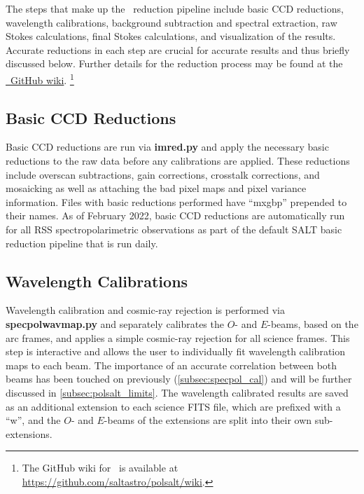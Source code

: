 The steps that make up the \polsalt\ reduction pipeline include basic \gls{CCD} reductions, wavelength calibrations, background subtraction and spectral extraction, raw Stokes calculations, final Stokes calculations, and visualization of the results. Accurate reductions in each step are crucial for accurate results and thus briefly discussed below. Further details for the reduction process may be found at the \href{https://github.com/saltastro/polsalt/wiki}{\polsalt\ GitHub wiki}.%
\footnote{The GitHub wiki for \polsalt\ is available at \url{https://github.com/saltastro/polsalt/wiki}.}

\subsection{Basic CCD Reductions}

Basic \gls{CCD} reductions are run via \textbf{imred.py} and apply the necessary basic reductions to the raw data before any calibrations are applied. These reductions include overscan subtractions, gain corrections, crosstalk corrections, and mosaicking as well as attaching the bad pixel maps and pixel variance information. Files with basic reductions performed have ``mxgbp'' prepended to their names. As of February 2022, basic \gls{CCD} reductions are automatically run for all RSS spectropolarimetric observations as part of the default SALT basic reduction pipeline that is run daily.

\subsection{Wavelength Calibrations}

Wavelength calibration and cosmic-ray rejection is performed via \textbf{specpolwavmap.py} and separately calibrates the $O$- and $E$-beams, based on the arc frames, and applies a simple cosmic-ray rejection for all science frames. This step is interactive and allows the user to individually fit wavelength calibration maps to each beam. The importance of an accurate correlation between both beams has been touched on previously (\autoref{subsec:specpol_cal}) and will be further discussed in \autoref{subsec:polsalt_limits}. The wavelength calibrated results are saved as an additional extension to each science FITS file, which are prefixed with a ``w'', and the $O$- and $E$-beams of the extensions are split into their own sub-extensions.

